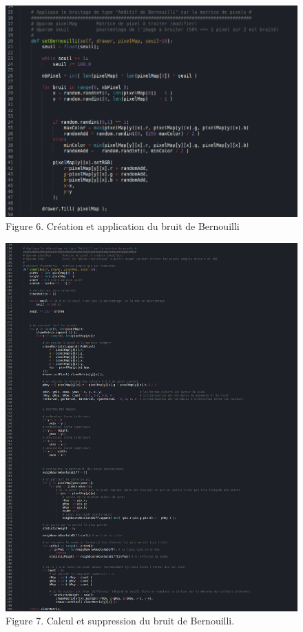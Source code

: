 \documentclass{article}
\begin{document}
	
		\begin{figure}
			\begin{center}
				\includegraphics[scale=.38]{st3/Bernouilli_SET.jpg}\\
				Figure 6. Création et application du bruit de Bernouilli
			\end{center}
			\begin{center}
				\includegraphics[scale=.23]{st3/Bernouilli_UNSET.jpg}\\
				Figure 7. Calcul et suppression du bruit de Bernouilli.
			\end{center}
		\end{figure}
	
\end{document}
